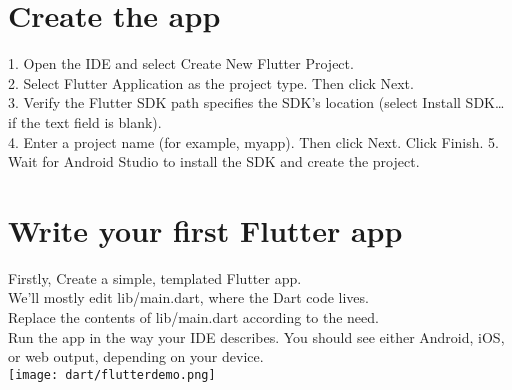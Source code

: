 \section{Create the app}
1. Open the IDE and select Create New Flutter Project.\\
2. Select Flutter Application as the project type. Then click Next.\\
3. Verify the Flutter SDK path specifies the SDK’s location (select Install SDK… if the text field is blank).\\
4. Enter a project name (for example, myapp). Then click Next.
Click Finish.
5. Wait for Android Studio to install the SDK and create the project.

\section{Write your first Flutter app}
Firstly, Create a simple, templated Flutter app.\\
We’ll mostly edit lib/main.dart, where the Dart code lives.\\
Replace the contents of lib/main.dart according to the need.\\
Run the app in the way your IDE describes. You should see either Android, iOS, or web output, depending on your device.\\

\texttt{[image: dart/flutterdemo.png]}\\[0.5cm]
